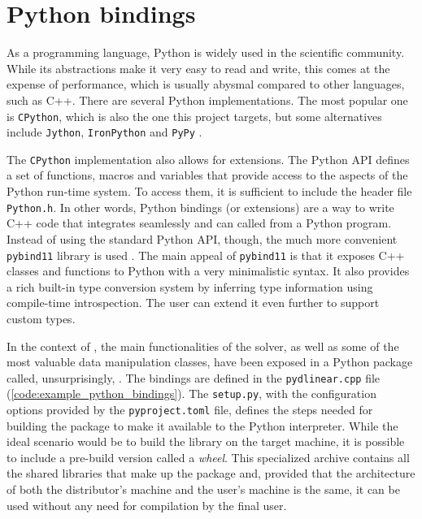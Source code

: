 \clearpage

\section{Python bindings}

As a programming language, Python is widely used in the scientific community.
While its abstractions make it very easy to read and write, this comes at the expense of performance, which is usually abysmal compared to other languages, such as C++.
There are several Python implementations.
The most popular one is \texttt{CPython}, which is also the one this project targets, but some alternatives include \texttt{Jython}, \texttt{IronPython} and \texttt{PyPy} \cite{man:python-implementations}.

The \texttt{CPython} implementation also allows for extensions.
The Python API defines a set of functions, macros and variables that provide access to the aspects of the Python run-time system.
To access them, it is sufficient to include the header file \texttt{Python.h}.
In other words, Python bindings (or extensions) are a way to write C++ code that integrates seamlessly and can called from a Python program.
Instead of using the standard Python API, though, the much more convenient \texttt{pybind11} library is used \cite{man:pybind11}.
The main appeal of \texttt{pybind11} is that it exposes C++ classes and functions to Python with a very minimalistic syntax.
It also provides a rich built-in type conversion system by inferring type information using compile-time introspection.
The user can extend it even further to support custom types.

In the context of \dlinear, the main functionalities of the solver, as well as some of the most valuable data manipulation classes, have been exposed in a Python package called, unsurprisingly, \pydlinear.
The bindings are defined in the \texttt{pydlinear.cpp} file (\autoref{code:example_python_bindings}).
The \texttt{setup.py}, with the configuration options provided by the \texttt{pyproject.toml} file, defines the steps needed for building the package to make it available to the Python interpreter.
While the ideal scenario would be to build the \dlinear library on the target machine, it is possible to include a pre-build version called a \textit{wheel}.
This specialized archive contains all the shared libraries that make up the package and, provided that the architecture of both the distributor's machine and the user's machine is the same, it can be used without any need for compilation by the final user.

